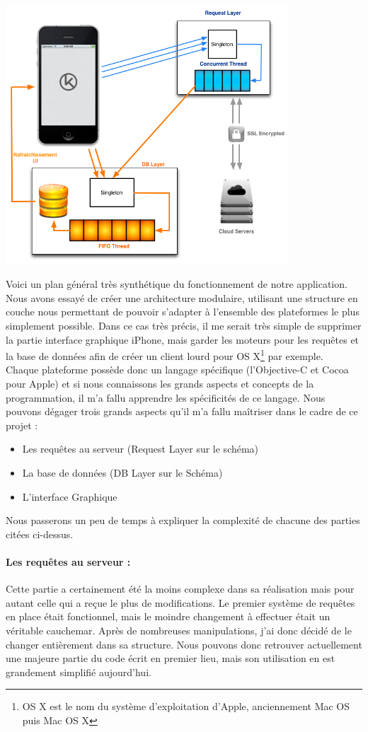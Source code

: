 \documentclass{article}
\begin{document}
\includegraphics[width=400px]{Images/schema_general_simplifie.png}

Voici un plan général très synthétique du fonctionnement de notre application. Nous avons essayé de créer une architecture modulaire, utilisant une structure en couche nous permettant de pouvoir s'adapter à l'ensemble des plateformes le plus simplement possible. Dans ce cas très précis, il me serait très simple de supprimer la partie interface graphique iPhone, mais garder les moteurs pour les requêtes et la base de données afin de créer un client lourd pour OS X\footnote{OS X est le nom du système d'exploitation d'Apple, anciennement Mac OS puis Mac OS X} par exemple.\\

Chaque plateforme possède donc un langage spécifique (l'Objective-C et Cocoa pour Apple) et si nous connaissons les grands aspects et concepts de la programmation, il m'a fallu apprendre les spécificités de ce langage. Nous pouvons dégager trois grands aspects qu'il m'a fallu maîtriser dans le cadre de ce projet : 


\begin{itemize}
	\item Les requêtes au serveur (Request Layer sur le schéma)
	\item La base de données (DB Layer sur le Schéma)
	\item L'interface Graphique\\
\end{itemize}
Nous passerons un peu de temps à expliquer la complexité de chacune des parties citées ci-dessus.
		\paragraph{Les requêtes au serveur :}
		Cette partie a certainement été la moins complexe dans sa réalisation mais pour autant celle qui a  re\c cue le plus de modifications. Le premier système de requêtes en place était fonctionnel, mais le moindre changement à effectuer était un véritable cauchemar. Après de nombreuses manipulations, j'ai donc décidé de le changer entièrement dans sa structure. Nous pouvons donc retrouver actuellement une majeure partie du code écrit en premier lieu, mais son utilisation en est grandement simplifié aujourd'hui.\\
		
\end{document}
